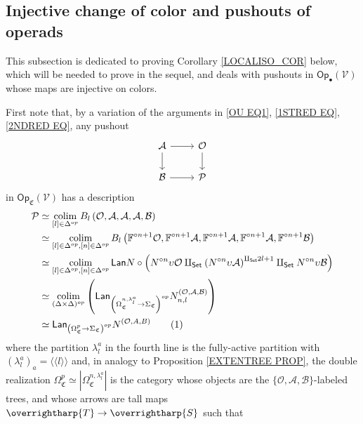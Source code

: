 \documentclass[a4paper,10pt
,draft
]{article}%
\numberwithin{equation}{section}
\numberwithin{figure}{section}
\theoremstyle{definition} %
\newcommand{\vect}[1]{\text{\overrightharp{\ensuremath{#1}}}}
\DeclareMathOperator{\colim}{colim}%
\newcommand{\V}{\ensuremath{\mathcal V}}
\renewcommand{\O}{\ensuremath{\mathcal O}}
\newcommand{\1}{\ensuremath{\mathbbm 1}}%
\newcommand{\OC}{\Omega_{\mathfrak C}}
\begin{document}
\subsection{Injective change of color and pushouts of operads}
\label{INJCOLCH AP}

This subsection is dedicated to proving
Corollary \ref{LOCALISO_COR} below,
which will be needed 
to prove \cite[Prop. \ref{AC-J_CELL_PROP}]{BP_ACOP} in the sequel,
and deals with pushouts in 
$\mathsf{Op}_{\bullet}(\V)$
whose maps are injective on colors.


First note that, by a variation of the arguments in \eqref{OU EQ1}, \eqref{1STRED EQ}, \eqref{2NDRED EQ},
any pushout 
\[
\begin{tikzcd}
\mathcal{A} \ar{r} \ar{d} & \mathcal{O} \ar{d}
\\
\mathcal{B} \ar{r} & \mathcal{P}
\end{tikzcd}
\]
in $\mathsf{Op}_{\mathfrak{C}}(\V) $ has a description
\begin{align*}
\mathcal{P}
&
\simeq \colim_{[l] \in \Delta^{op}} 
B_l \left( \O, \mathcal{A}, \mathcal{A}, \mathcal{A}, \mathcal{B} \right)
\\
&
\simeq \colim_{[l] \in \Delta^{op},[n] \in \Delta^{op}} 
B_l \left( 
\mathbb F^{\circ n+1} \O, 
\mathbb F^{\circ n+1} \mathcal{A}, 
\mathbb F^{\circ n+1} \mathcal{A}, 
\mathbb F^{\circ n+1} \mathcal{A}, 
\mathbb F^{\circ n+1} \mathcal{B} \right)
\\
&
\simeq \colim_{[l] \in \Delta^{op},[n] \in \Delta^{op}} 
\mathsf{Lan} N \circ \left( N^{\circ n} \upsilon \O 
\amalg_{\mathsf{Set}}
\left( N^{\circ n} \upsilon \mathcal{A}\right)^{\amalg_{\mathsf{Set}} 2l +1}
\amalg_{\mathsf{Set}}
N^{\circ n} \upsilon \mathcal{B} \right)
\\
&	
\simeq
\mathop{\colim}\limits_{(\Delta \times \Delta)^{op}}
\left(
\mathsf{Lan}_{\left(\Omega_{\mathfrak C}^{n,\lambda^a_l} \to \Sigma_{\mathfrak C}\right)^{op}} N_{n,l}^{(\O,\mathcal{A},\mathcal{B})}
\right)
\\
&	
\simeq
\mathsf{Lan}_{\left(\Omega_{\mathfrak C}^{p} \to
	\Sigma_{\mathfrak C}\right)^{op}} N^{(\O,A,B)}
\stepcounter{equation}\tag{\theequation}\label{OU EQ2}
\end{align*}
where the partition $\lambda^a_l$ in the fourth line is the fully-active partition with $\left(\lambda^a_l\right)_a = \langle \langle l \rangle \rangle$
and, in analogy to Proposition \ref{EXTENTREE PROP},
the double realization
$\OC^p \simeq |\Omega_{\mathfrak C}^{n,\lambda^a_l}|$
is the category whose objects are the
$\{\mathcal{O},\mathcal{A},\mathcal{B}\}$-labeled trees,
and whose arrows are tall maps $\vect{T} \to \vect{S}$ such that
\end{document}
